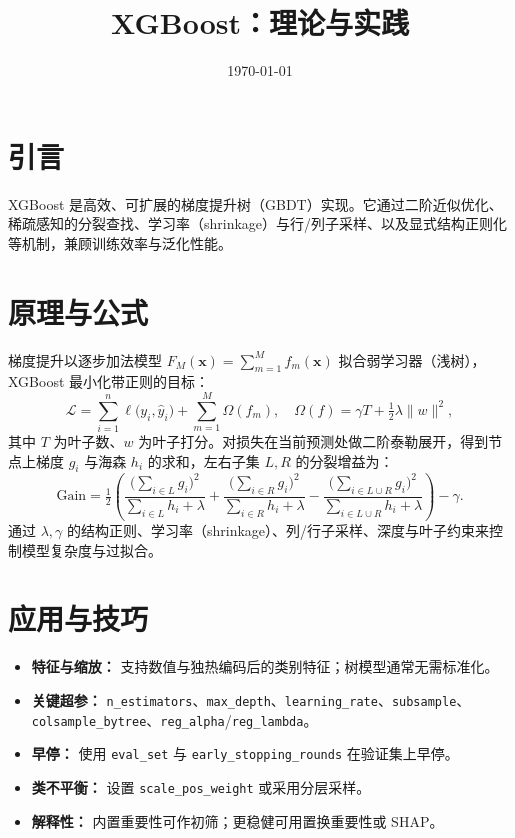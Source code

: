 \documentclass[UTF8,zihao=-4]{ctexart}
\title{XGBoost：理论与实践}
\author{}
\date{\today}
\begin{document}
\maketitle


\section{引言}
XGBoost 是高效、可扩展的梯度提升树（GBDT）实现。它通过二阶近似优化、稀疏感知的分裂查找、学习率（shrinkage）与行/列子采样、以及显式结构正则化等机制，兼顾训练效率与泛化性能。

\section{原理与公式}
梯度提升以逐步加法模型 $F_M(\mathbf{x})=\sum_{m=1}^M f_m(\mathbf{x})$ 拟合弱学习器（浅树），XGBoost 最小化带正则的目标：
\begin{equation}
\mathcal{L} = \sum_{i=1}^n \ell\big(y_i, \hat{y}_i\big) + \sum_{m=1}^M \Omega(f_m), \quad \Omega(f)=\gamma T + \tfrac{1}{2}\lambda \lVert w \rVert^2,
\end{equation}
其中 $T$ 为叶子数、$w$ 为叶子打分。对损失在当前预测处做二阶泰勒展开，得到节点上梯度 $g_i$ 与海森 $h_i$ 的求和，左右子集 $L,R$ 的分裂增益为：
\begin{equation}
\mathrm{Gain} = \tfrac{1}{2}\! \left( \frac{\big(\sum_{i\in L} g_i\big)^2}{\sum_{i\in L} h_i + \lambda} + \frac{\big(\sum_{i\in R} g_i\big)^2}{\sum_{i\in R} h_i + \lambda} - \frac{\big(\sum_{i\in L\cup R} g_i\big)^2}{\sum_{i\in L\cup R} h_i + \lambda} \right) - \gamma.
\end{equation}
通过 $\lambda,\gamma$ 的结构正则、学习率（shrinkage）、列/行子采样、深度与叶子约束来控制模型复杂度与过拟合。

\section{应用与技巧}
\begin{itemize}
  \item \textbf{特征与缩放：} 支持数值与独热编码后的类别特征；树模型通常无需标准化。
  \item \textbf{关键超参：} \texttt{n\_estimators}、\texttt{max\_depth}、\texttt{learning\_rate}、\texttt{subsample}、\texttt{colsample\_bytree}、\texttt{reg\_alpha}/\texttt{reg\_lambda}。
  \item \textbf{早停：} 使用 \texttt{eval\_set} 与 \texttt{early\_stopping\_rounds} 在验证集上早停。
  \item \textbf{类不平衡：} 设置 \texttt{scale\_pos\_weight} 或采用分层采样。
  \item \textbf{解释性：} 内置重要性可作初筛；更稳健可用置换重要性或 SHAP。
\end{itemize}
\end{document}
